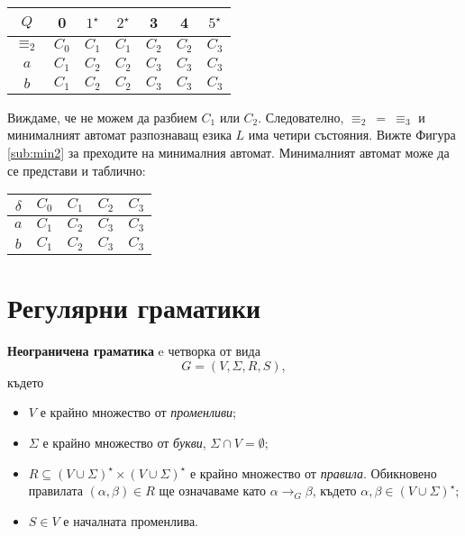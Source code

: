\begin{example}
\begin{itemize}
      \begin{tabular}{|c|c|c|c|c|c|c|}
        \hline
        $Q$ & 0 & $1^\star$ & $2^\star$ & 3 & 4 & $5^\star$ \\
        \hline
        \hline
        $\equiv_2$ & $C_0$ & $C_1$ & $C_1$ & $C_2$ & $C_2$ & $C_3$\\
        \hline
        $a$ & $C_1$ & $C_2$ & $C_2$ & $C_3$ & $C_3$ & $C_3$\\
        \hline
        $b$ & $C_1$ & $C_2$ & $C_2$ & $C_3$ & $C_3$ & $C_3$\\
        \hline
      \end{tabular}
      
      Виждаме, че не можем да разбием $C_1$ или $C_2$.
      Следователно, $\equiv_2\ =\ \equiv_3$ и минималният автомат разпознаващ езика $L$
      има четири състояния. Вижте Фигура \ref{sub:min2} за преходите на минималния автомат.
      Минималният автомат може да се представи и таблично:

      \begin{tabular}{|c|c|c|c|c|}
        \hline
        $\delta$ & $C_0$ & $C_1$ & $C_2$ & $C_3$ \\
        \hline
        $a$ & $C_1$ & $C_2$ & $C_3$ & $C_3$ \\
        \hline
        $b$ & $C_1$ & $C_2$ & $C_3$ & $C_3$ \\
        \hline
      \end{tabular}
      
  \end{itemize}
\end{example}

\section{Регулярни граматики}

{\bf Неограничена граматика} e четворка от вида
\[G = (V, \Sigma, R, S),\]
където
\begin{itemize}
\item
  $V$ е крайно множество от {\em променливи};
\item
  $\Sigma$ е крайно множество от {\em букви}, $\Sigma \cap V = \emptyset$;
\item
  $R \subseteq (V\cup\Sigma)^\star \times (V \cup \Sigma)^\star$ е крайно множество от {\em правила}.
  Обикновено правилата $(\alpha, \beta) \in R$ ще означаваме като 
  $\alpha \to_G \beta$, където $\alpha, \beta \in (V \cup \Sigma)^\star$;
\item
  $S \in V$ е началната променлива. 
\end{itemize}

